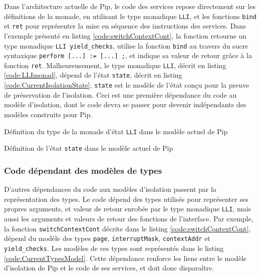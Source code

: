 			Dans l'architecture actuelle de Pip, le code des services repose directement sur les définitions de la monade, en utilisant le type monadique \texttt{LLI}, et les fonctions \texttt{bind} et \texttt{ret} pour représenter la mise en séquence des instructions des services. Dans l'exemple présenté en listing \ref{code:switchContextCont}, la fonction retourne un type monadique \texttt{LLI yield\_checks}, utilise la fonction \texttt{bind} au travers du sucre syntaxique \texttt{perform [...] := [...] ;}, et indique sa valeur de retour grâce à la fonction \texttt{ret}.
			Malheureusement, le type monadique \texttt{LLI}, décrit en listing \ref{code:LLImonad}, dépend de l'état \texttt{state}, décrit en listing \ref{code:CurrentIsolationState}. \texttt{state} est le modèle de l'état conçu pour la preuve de préservation de l'isolation. Ceci est une première dépendance du code au modèle d'isolation, dont le code devra se passer pour devenir indépendants des modèles construits pour Pip.

			\begin{listing}[!ht]
				\caption{Définition du type de la monade d'état \texttt{LLI} dans le modèle actuel de Pip}
				\label{code:LLImonad}
			\end{listing}

			\begin{listing}[!ht]
				\caption{Définition de l'état \texttt{state} dans le modèle actuel de Pip}
				\label{code:CurrentIsolationState}
			\end{listing}

			\subsubsection{Code dépendant des modèles de types}

			D'autres dépendances du code aux modèles d'isolation passent par la représentation des types. Le code dépend des types utilisés pour représenter ses propres arguments, et valeur de retour enrobée par le type monadique \texttt{LLI}, mais aussi les arguments et valeurs de retour des fonctions de l'interface. Par exemple, la fonction \texttt{switchContextCont} décrite dans le listing \ref{code:switchContextCont}, dépend du modèle des types \texttt{page}, \texttt{interruptMask}, \texttt{contextAddr} et \texttt{yield\_checks}. Les modèles de ces types sont représentés dans le listing \ref{code:CurrentTypesModel}.
Cette dépendance renforce les liens entre le modèle d'isolation de Pip et le code de ses services, et doit donc disparaître.

